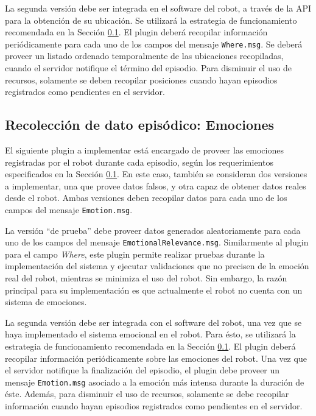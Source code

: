 La segunda versión debe ser integrada en el software del robot, a través de la API para la obtención de su ubicación. Se utilizará la estrategia de funcionamiento recomendada en la Sección \ref{}. El plugin deberá recopilar información periódicamente para cada uno de los campos del mensaje \texttt{Where.msg}. Se deberá proveer un listado ordenado temporalmente de las ubicaciones recopiladas, cuando el servidor notifique el término del episodio. Para disminuir el uso de recursos, solamente se deben recopilar posiciones cuando hayan episodios registrados como pendientes en el servidor.


\subsection{Recolección de dato episódico: Emociones}

El siguiente plugin a implementar está encargado de proveer las emociones registradas por el robot durante cada episodio, según los requerimientos especificados en la Sección \ref{}. En este caso, también se consideran dos versiones a implementar, una que provee datos falsos, y otra capaz de obtener datos reales desde el robot. Ambas versiones deben recopilar datos para cada uno de los campos del mensaje \texttt{Emotion.msg}.

La versión ``de prueba'' debe proveer datos generados aleatoriamente para cada uno de los campos del mensaje \texttt{EmotionalRelevance.msg}. Similarmente al plugin para el campo \textit{Where}, este plugin permite realizar pruebas durante la implementación del sistema y ejecutar validaciones que no precisen de la emoción real del robot, mientras se minimiza el uso del robot. Sin embargo, la razón principal para su implementación es que actualmente el robot no cuenta con un sistema de emociones.

La segunda versión debe ser integrada con el software del robot, una vez que se haya implementado el sistema emocional en el robot. Para ésto, se utilizará la estrategia de funcionamiento recomendada en la Sección \ref{}. El plugin deberá recopilar información periódicamente sobre las emociones del robot. Una vez que el servidor notifique la finalización del episodio, el plugin debe proveer un mensaje \texttt{Emotion.msg} asociado a la emoción más intensa durante la duración de éste. Además, para disminuir el uso de recursos, solamente se debe recopilar información cuando hayan episodios registrados como pendientes en el servidor.

